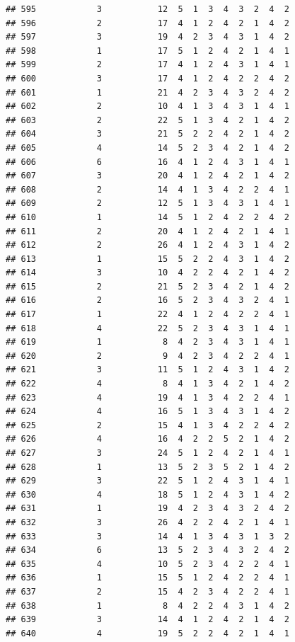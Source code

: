 \documentclass[12pt,]{krantz}
\theoremstyle{definition}
\theoremstyle{definition}
\theoremstyle{remark}
\begin{document}
\begin{verbatim}
## 595            3           12  5  1  3  4  3  2  4  2
## 596            2           17  4  1  2  4  2  1  4  2
## 597            3           19  4  2  3  4  3  1  4  2
## 598            1           17  5  1  2  4  2  1  4  1
## 599            2           17  4  1  2  4  3  1  4  1
## 600            3           17  4  1  2  4  2  2  4  2
## 601            1           21  4  2  3  4  3  2  4  2
## 602            2           10  4  1  3  4  3  1  4  1
## 603            2           22  5  1  3  4  2  1  4  2
## 604            3           21  5  2  2  4  2  1  4  2
## 605            4           14  5  2  3  4  2  1  4  2
## 606            6           16  4  1  2  4  3  1  4  1
## 607            3           20  4  1  2  4  2  1  4  2
## 608            2           14  4  1  3  4  2  2  4  1
## 609            2           12  5  1  3  4  3  1  4  1
## 610            1           14  5  1  2  4  2  2  4  2
## 611            2           20  4  1  2  4  2  1  4  1
## 612            2           26  4  1  2  4  3  1  4  2
## 613            1           15  5  2  2  4  3  1  4  2
## 614            3           10  4  2  2  4  2  1  4  2
## 615            2           21  5  2  3  4  2  1  4  2
## 616            2           16  5  2  3  4  3  2  4  1
## 617            1           22  4  1  2  4  2  2  4  1
## 618            4           22  5  2  3  4  3  1  4  1
## 619            1            8  4  2  3  4  3  1  4  1
## 620            2            9  4  2  3  4  2  2  4  1
## 621            3           11  5  1  2  4  3  1  4  2
## 622            4            8  4  1  3  4  2  1  4  2
## 623            4           19  4  1  3  4  2  2  4  1
## 624            4           16  5  1  3  4  3  1  4  2
## 625            2           15  4  1  3  4  2  2  4  2
## 626            4           16  4  2  2  5  2  1  4  2
## 627            3           24  5  1  2  4  2  1  4  1
## 628            1           13  5  2  3  5  2  1  4  2
## 629            3           22  5  1  2  4  3  1  4  1
## 630            4           18  5  1  2  4  3  1  4  2
## 631            1           19  4  2  3  4  3  2  4  2
## 632            3           26  4  2  2  4  2  1  4  1
## 633            3           14  4  1  3  4  3  1  3  2
## 634            6           13  5  2  3  4  3  2  4  2
## 635            4           10  5  2  3  4  2  2  4  1
## 636            1           15  5  1  2  4  2  2  4  1
## 637            2           15  4  2  3  4  2  2  4  1
## 638            1            8  4  2  2  4  3  1  4  2
## 639            3           14  4  1  2  4  2  1  4  2
## 640            4           19  5  2  2  4  2  1  4  1

\end{verbatim}
\end{document}

